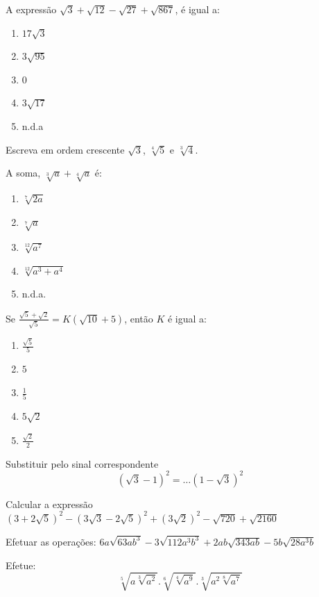 \begin{exer}[EsPCEx] A expressão $\sqrt{3} + \sqrt{12} -\sqrt{27} +\sqrt{867}$, é igual a:
\begin{enumerate}[A ( )]
\item $17\sqrt{3}$
\item $3\sqrt{95}$
\item $0$
\item $3\sqrt{17}$
\item n.d.a
\end{enumerate}
\end{exer}
\begin{exer} Escreva em ordem crescente $\sqrt{3}$, $\sqrt[4]{5}$ e $\sqrt[3]{4}$.
\end{exer}
\begin{exer}[EsPCEx]A soma, $\sqrt[3]{a} + \sqrt[4]{a}$ é:
\begin{enumerate}[A ( )]
\item $\sqrt[7]{2a}$
\item $\sqrt[7]{a}$
\item $\sqrt[12]{a^7}$
\item $\sqrt[12]{a^3+a^4}$
\item n.d.a.
\end{enumerate}
\end{exer}
\begin{exer}[EPCAR] Se $\frac{\sqrt{5}+\sqrt{2}}{\sqrt{5}}=K(\sqrt{10}+5)$, então $K$ é igual a:
\begin{enumerate}[A ( )]
\item $\frac{\sqrt{5}}{5}$
\item $5$
\item $\frac{1}{5}$
\item $5\sqrt{2}$
\item $\frac{\sqrt{2}}{2}$
\end{enumerate}
\end{exer}
\begin{exer}[EsPCEx]Substituir pelo sinal correspondente $$(\sqrt{3}-1)^2=\ldots(1-\sqrt{3})^2 $$
\end{exer}
\begin{exer}[EsPCEx]Calcular a expressão $(3+2\sqrt{5})^2-(3\sqrt{3}-2\sqrt{5})^2+(3\sqrt{2})^2-\sqrt{720}+\sqrt{2160}$
\end{exer}
\begin{exer}[EsPCEx]Efetuar as operações: $ 6a\sqrt{63ab^3}-3\sqrt{112a^3b^3}+2ab\sqrt{343ab}-5b\sqrt{28a^3b} $
\end{exer}
\begin{exer}[EsPCEx]Efetue:$$\sqrt[5]{a\sqrt[3]{a^2}}.\sqrt[6]{\sqrt[4]{a^9}}.\sqrt[3]{a^2\sqrt[8]{a^7}}$$
\end{exer}
